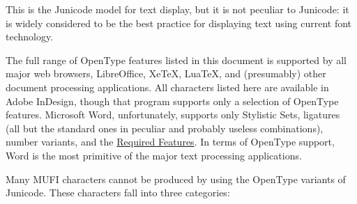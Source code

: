 \documentclass[12pt,letterpaper,openany]{book}
\newcounter{Feature}
\begin{document}
This is the Junicode model for text display, but it is not peculiar to Junicode: it is widely considered to be the best
practice for displaying text using current font technology.

The full range of OpenType features listed in this document is supported by all major web browsers, LibreOffice, XeTeX,
LuaTeX, and (presumably) other document processing applications. All characters listed here are available in Adobe
InDesign, though that program supports only a selection of OpenType features. Microsoft Word, unfortunately, supports
only Stylistic Sets, ligatures (all but the standard ones in peculiar and probably useless combinations), number
variants, and the \hyperlink{req}{Required Features}. In terms of
OpenType support, Word is the most primitive of the major text processing applications.

Many MUFI characters cannot be produced by using the OpenType variants of Junicode. These characters fall into three
categories:
\end{document}
